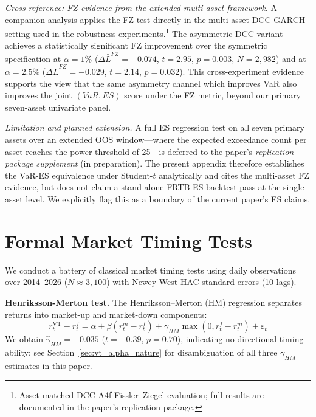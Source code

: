 \textit{Cross-reference: FZ evidence from the extended multi-asset framework.} A companion analysis applies the FZ test directly in the multi-asset DCC-GARCH setting used in the robustness experiments.\footnote{Asset-matched DCC-A4f Fissler--Ziegel evaluation; full results are documented in the paper's replication package.} The asymmetric DCC variant achieves a statistically significant FZ improvement over the symmetric specification at $\alpha = 1\%$ ($\Delta\bar{L}^{FZ} = -0.074$, $t = 2.95$, $p = 0.003$, $N = 2{,}982$) and at $\alpha = 2.5\%$ ($\Delta\bar{L}^{FZ} = -0.029$, $t = 2.14$, $p = 0.032$). This cross-experiment evidence supports the view that the same asymmetry channel which improves VaR also improves the joint $(V\!aR, ES)$ score under the FZ metric, beyond our primary seven-asset univariate panel.

\textit{Limitation and planned extension.} A full \citet{bayerdimitriadis2022} ES regression test on all seven primary assets over an extended OOS window---where the expected exceedance count per asset reaches the power threshold of 25---is deferred to the paper's \emph{replication package supplement} (in preparation). The present appendix therefore establishes the VaR-ES equivalence under Student-$t$ analytically and cites the multi-asset FZ evidence, but does not claim a stand-alone FRTB ES backtest pass at the single-asset level. We explicitly flag this as a boundary of the current paper's ES claims.

\section{Formal Market Timing Tests}
\label{sec:timing_tests}

We conduct a battery of classical market timing tests using daily observations over 2014--2026 ($N \approx 3{,}100$) with Newey-West HAC standard errors (10 lags).

\textbf{Henriksson-Merton test.} The \citet{henriksson1981} Henriksson--Merton (HM) regression separates returns into market-up and market-down components:
\begin{equation}
r^{\text{VT}}_t - r^f_t = \alpha + \beta (r^m_t - r^f_t) + \gamma_{HM} \max(0, r^f_t - r^m_t) + \varepsilon_t
\end{equation}
We obtain $\hat{\gamma}_{HM} = -0.035$ ($t = -0.39$, $p = 0.70$), indicating no directional timing ability; see Section~\ref{sec:vt_alpha_nature} for disambiguation of all three $\gamma_{HM}$ estimates in this paper.

